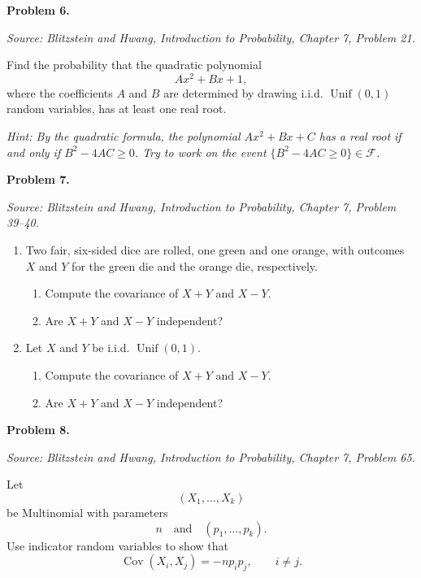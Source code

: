 \documentclass[11pt]{article}
\newcommand{\source}[2]{%
    \vspace{0.15cm}
    {\small\textit{Source: Blitzstein and Hwang, \textit{Introduction to Probability}, Chapter #1, Problem #2.}}
}
\begin{document}
\newpage

\begin{problemheader}
\textbf{Problem 6.}
\end{problemheader}
\source{7}{21}

Find the probability that the quadratic polynomial
$$
Ax^2+Bx+1,
$$
where the coefficients $A$ and $B$ are determined by drawing i.i.d. $\operatorname{Unif}(0,1)$ random variables, has at least one real root.

\emph{Hint: By the quadratic formula, the polynomial $Ax^2+Bx+C$ has a real root if and only if $B^2-4AC\ge0$. Try to work on the event $\{B^2-4AC\geq 0\}\in \mathcal{F}$. } 

\newpage



\begin{problemheader}
\textbf{Problem 7. }
\end{problemheader}
\source{7}{39--40}

\begin{enumerate}[label=(\alph*), leftmargin=*]
    \item Two fair, six-sided dice are rolled, one green and one orange, with outcomes $X$ and $Y$ for the green die and the orange die, respectively.
    \begin{enumerate}[label=(\roman*), leftmargin=*]
        \item Compute the covariance of $X+Y$ and $X-Y$.
        \item Are $X+Y$ and $X-Y$ independent?
    \end{enumerate}

    \item Let $X$ and $Y$ be i.i.d. $\operatorname{Unif}(0,1)$.
    \begin{enumerate}[label=(\roman*), leftmargin=*]
        \item Compute the covariance of $X+Y$ and $X-Y$.
        \item Are $X+Y$ and $X-Y$ independent?
    \end{enumerate}
\end{enumerate}

\newpage


\begin{problemheader}
\textbf{Problem 8. }
\end{problemheader}
\source{7}{65}

Let
\[
(X_1,\dots,X_k)
\]
be Multinomial with parameters
\[
n \quad \text{and} \quad (p_1,\dots,p_k).
\]
Use indicator random variables to show that
\[
\operatorname{Cov}(X_i,X_j)=-np_ip_j,
\qquad i\ne j.
\]
\end{document}
